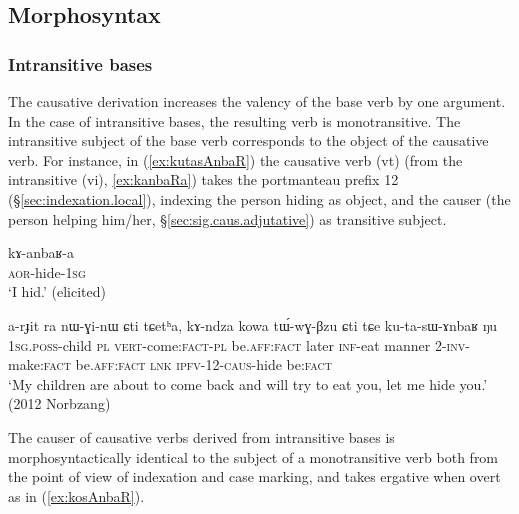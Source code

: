  

\subsection{Morphosyntax} \label{sec:sig.caus.morphosyntax}

\subsubsection{Intransitive bases} \label{sec:sig.caus.intr}
 
The causative derivation increases the valency of the base verb by one argument. In the case of intransitive bases, the resulting verb is monotransitive. The intransitive subject of the base verb  corresponds to the object of the causative verb. For instance, in (\ref{ex:kutasAnbaR}) the causative verb  (vt) (from the intransitive  (vi), \ref{ex:kanbaRa})  takes the portmanteau prefix 1\fl{}2  (§\ref{sec:indexation.local}), indexing the person hiding as object, and the causer (the person helping him/her, §\ref{sec:sig.caus.adjutative}) as transitive subject.


\begin{exe}
\ex \label{ex:kanbaRa}
\gll kɤ-anbaʁ-a \\
\textsc{aor}-hide-\textsc{1sg} \\
\glt `I hid.' (elicited)
\end{exe}

\begin{exe}
\ex \label{ex:kutasAnbaR}
\gll a-rɟit ra nɯ-ɣi-nɯ ɕti tɕetʰa, kɤ-ndza kowa tɯ́-wɣ-βzu ɕti tɕe ku-ta-sɯ-ɤnbaʁ ŋu \\
\textsc{1sg}.\textsc{poss}-child \textsc{pl} \textsc{vert}-come:\textsc{fact}-\textsc{pl} be.\textsc{aff}:\textsc{fact} later \textsc{inf}-eat manner 2-\textsc{inv}-make:\textsc{fact} be.\textsc{aff}:\textsc{fact} \textsc{lnk} \textsc{ipfv}-1\fl{}2-\textsc{caus}-hide be:\textsc{fact} \\
\glt `My children are about to come back and will try to eat you, let me hide you.' (2012 Norbzang)
\end{exe}
 
The causer of causative verbs derived from intransitive bases is morphosyntactically identical to the subject of a monotransitive verb both from the point of view of indexation and case marking, and takes ergative when overt as in (\ref{ex:kosAnbaR}).


